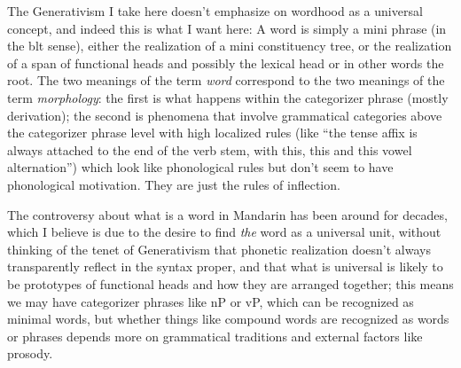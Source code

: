 \documentclass[UTF8, a4paper, oneside, scheme=plain, 12pt]{ctexrep}
\newcommand*{\term}[1]{\emph{#1}}
\begin{document}
{The Generativism I take here doesn't emphasize on wordhood as a universal concept,
and indeed this is what I want here:
A word is simply a mini phrase (in the \acs{blt} sense),
either the realization of a mini constituency tree,
or the realization of a span of functional heads 
and possibly the lexical head or in other words the root.
The two meanings of the term \term{word} 
correspond to the two meanings of
the term \term{morphology}:
the first is what happens within the categorizer phrase
(mostly derivation);
the second is phenomena that involve grammatical categories 
above the categorizer phrase level 
with high localized rules 
(like ``the tense affix is always attached to the end of the verb stem, 
with this, this and this vowel alternation'') 
which look like phonological rules but don't seem to have phonological motivation. 
They are just the rules of inflection. 

The controversy about what is a word in Mandarin 
has been around for decades,
which I believe is due to the desire to 
find \emph{the} word as a universal unit,
without thinking of the tenet of Generativism 
that phonetic realization doesn't always 
transparently reflect in the syntax proper,
and that what is universal is likely to be 
prototypes of functional heads and how they are arranged together;
this means we may have categorizer phrases like nP or vP,
which can be recognized as minimal words,
but whether things like compound words are recognized as words or phrases 
depends more on grammatical traditions
and external factors like prosody.

}
\end{document}
